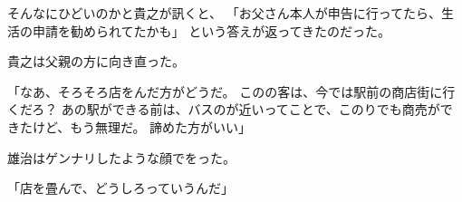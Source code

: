 \documentclass[chapter3.tex]{subfiles}
\begin{document}
\begin{CJK}{UTF8}{ipxm}
    そんなにひどいのかと貴之が訊くと、
    「お父さん本人が申告に行ってたら、生活の申請を勧められてたかも」
    という答えが返ってきたのだった。

    貴之は父親の方に向き直った。

    「なあ、そろそろ店をんだ方がどうだ。
    このの客は、今では駅前の商店街に行くだろ？
    あの駅ができる前は、バスのが近いってことで、このりでも商売ができたけど、もう無理だ。
    諦めた方がいい」

    雄治はゲンナリしたような顔でをった。

    「店を畳んで、どうしろっていうんだ」

    　


\end{CJK}
\end{document}
